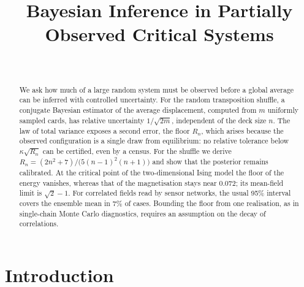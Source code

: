 \documentclass[ba]{imsart}
\theoremstyle{plain}
\theoremstyle{definition}
\begin{document}
\begin{frontmatter}
\title{Bayesian Inference in Partially Observed Critical Systems}

\begin{aug}
\author[A]{~}
\address[A]{AFFILIATION AND E-MAIL TO BE COMPLETED}
\end{aug}

\begin{abstract}
We ask how much of a large random system must be observed before a global average can be inferred with controlled uncertainty. For the random transposition shuffle, a conjugate Bayesian estimator of the average displacement, computed from $m$ uniformly sampled cards, has relative uncertainty $1/\sqrt{2m}$, independent of the deck size $n$. The law of total variance exposes a second error, the floor $R_n$, which arises because the observed configuration is a single draw from equilibrium: no relative tolerance below $\kappa\sqrt{R_n}$ can be certified, even by a census. For the shuffle we derive $R_n=(2n^2+7)/\bigl(5(n-1)^2(n+1)\bigr)$ and show that the posterior remains calibrated. At the critical point of the two-dimensional Ising model the floor of the energy vanishes, whereas that of the magnetisation stays near $0.072$; its mean-field limit is $\sqrt{2}-1$. For correlated fields read by sensor networks, the usual 95\% interval covers the ensemble mean in 7\% of cases. Bounding the floor from one realisation, as in single-chain Monte Carlo diagnostics, requires an assumption on the decay of correlations.
\end{abstract}

\begin{keyword}[class=MSC]
\end{keyword}

\begin{keyword}
\end{keyword}

\end{frontmatter}

\section{Introduction}
\end{document}
